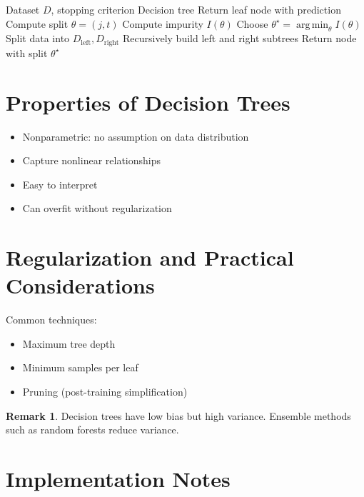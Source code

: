 \documentclass[12pt,oneside]{book}
\numberwithin{equation}{section}
\theoremstyle{definition}
\newtheorem{remark}{Remark}[section]
\theoremstyle{plain}
\theoremstyle{remark}
\newcommand{\argmin}{\operatorname*{arg\,min}}
\begin{document}
\begin{algorithm}[H]
\caption{Decision Tree Training}
\begin{algorithmic}[1]
\Require Dataset $D$, stopping criterion
\Ensure Decision tree
    \State Return leaf node with prediction
\EndIf
{}
    \State Compute split $\theta=(j,t)$
    \State Compute impurity $I(\theta)$
\EndFor
\State Choose $\theta^\star=\argmin_\theta I(\theta)$
\State Split data into $D_{\text{left}}, D_{\text{right}}$
\State Recursively build left and right subtrees
\State Return node with split $\theta^\star$
\end{algorithmic}
\end{algorithm}

\section{Properties of Decision Trees}

\begin{itemize}
    \item Nonparametric: no assumption on data distribution
    \item Capture nonlinear relationships
    \item Easy to interpret
    \item Can overfit without regularization
\end{itemize}

\section{Regularization and Practical Considerations}

Common techniques:
\begin{itemize}
    \item Maximum tree depth
    \item Minimum samples per leaf
    \item Pruning (post-training simplification)
\end{itemize}

\begin{remark}
Decision trees have low bias but high variance. Ensemble methods such as random forests reduce variance.
\end{remark}

\section{Implementation Notes}
\end{document}
